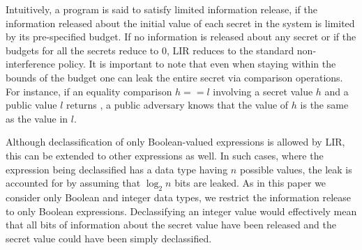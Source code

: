 Intuitively, a program is said to satisfy limited information release,
if the information released about the initial value of each secret in
the system is limited by its pre-specified budget. If no information 
is released about any secret or if the budgets for all the secrets 
reduce to $0$, LIR reduces to the standard
non-interference policy. It is important to note that even when
staying within the bounds of the budget one can leak the entire secret
via comparison operations. For instance, if an equality comparison
$h==l$ involving a secret value $h$ and a public value $l$ 
returns , a public adversary knows that the value of $h$ is
the same as the value in $l$. 

%

Although declassification of only Boolean-valued expressions is 
allowed by LIR, this can be extended to other expressions as well. 
In such cases, where the expression being declassified has a 
data type having $n$ possible values, the leak is 
accounted for by assuming that $\log_{2}n$ bits are leaked. 
As in this paper we consider only Boolean and integer data types, 
we restrict the information release to only Boolean expressions.  
Declassifying an integer value would effectively mean that all bits 
of information about the secret value have been released and the 
secret value could have been simply declassified.



